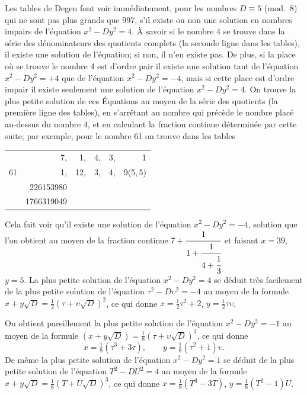 \documentclass[11pt,a4paper]{book}
\theoremstyle{plain}
\begin{document}
Les tables de Degen font voir imm\'{e}diatement, pour les nombres $D\equiv5$ (mod.~8) qui ne sont pas plus grands que 997, s'il existe ou non une solution en nombres impairs de l'\'{e}quation $x^2-Dy^2=4$. \`{A} savoir si le nombre 4 se trouve dans la s\'{e}rie des d\'{e}nominateurs des quotients complets (la seconde ligne dans les tables), il existe une solution de l'\'{e}quation; si non, il n'en existe pas. De plus, si la place o\`{u} se trouve le nombre 4 est d'ordre pair il existe une solution tant de l'\'{e}quation $x^2-Dy^2=+4$ que de l'\'{e}quation $x^2-Dy^2=-4$, mais si cette place est d'ordre impair il existe seulement une solution de l'\'{e}quation $x^2-Dy^2=4$. On trouve la plus petite solution de ces \'{E}quations au moyen de la s\'{e}rie des quotients (la premi\`{e}re ligne des tables), en s'arr\^{e}tant au nombre qui pr\'{e}c\`{e}de le nombre plac\'{e} au-dessus du nombre 4, et en calculant la fraction continue d\'{e}termin\'{e}e par cette suite; par exemple, pour le nombre 61 on trouve dans les tables
\begin{center}
\begin{tabular}{r|rrrrr}
\multirow{3}{*}{61} & 7, & 1, & 4, & 3, & 1\\
& 1, & 12, & 3, & 4, & 9\quad (5,\,5)\\
\cline{2-6}
& 226153980 & & & & \\
& 1766319049 & & & & \\
\end{tabular}
\end{center}
Cela fait voir qu'il existe une solution de l'\'{e}quation $x^2-Dy^2=-4$, solution que l'on obtient au moyen de la fraction continue $7+\cfrac{1}{1+\cfrac{1}{4+\cfrac{1}{3}}}$ et faisant $x=39$, $y=5$. La plus petite solution de l'\'{e}quation $x^2-Dy^2=4$ se d\'{e}duit tr\`{e}s facilement de la plus petite solution de l'\'{e}quation $\tau^2-D\upsilon^2=-4$ au moyen de la formule $x+y\sqrt{D}=\tfrac{1}{2}(\tau+\upsilon\sqrt{D})^2$, ce qui donne $x=\tfrac{1}{2}\tau^2+2$, $y=\tfrac{1}{2}\tau\upsilon$.

On obtient pareillement la plus petite solution de l'\'{e}quation $x^2-Dy^2=-1$ au moyen de la formule $(x+y\sqrt{D})=\tfrac{1}{8}(\tau+\upsilon\sqrt{D})^3$, ce qui donne
\[
x=\tfrac{1}{8}(\tau^3+3\tau),\qquad y=\tfrac{1}{8}(\tau^2+1)\upsilon.
\]
De m\^{e}me la plus petite solution de l'\'{e}quation $x^2-Dy^2=1$ se d\'{e}duit de la plus petite solution de l'\'{e}quation $T^2-DU^2=4$ au moyen de la formule $x+y\sqrt{D}=\tfrac{1}{8}(T+U\sqrt{D})^3$, ce qui donne $x=\tfrac{1}{8}(T^3-3T)$, $y=\tfrac{1}{8}(T^2-1)U$.
\end{document}
